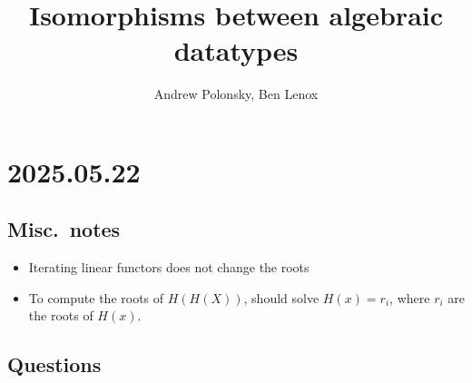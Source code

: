 \documentclass[letterpaper,numbers=enddot]{scrartcl}
\title{Isomorphisms between algebraic datatypes}
\author{Andrew Polonsky, Ben Lenox}
\begin{document}
\section*{2025.05.22}
\subsection*{Misc.\ notes}
\begin{itemize}
  \item Iterating linear functors does not change the roots
  \item To compute the roots of $H(H(X))$, should solve $H(x) = r_i$, where $r_i$ are the roots of $H(x)$.
\end{itemize}

\subsection*{Questions}
\end{document}
